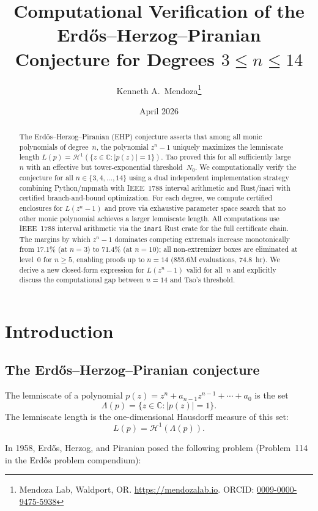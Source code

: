 \documentclass[11pt]{article}
\title{Computational Verification of the Erd\H{o}s--Herzog--Piranian\\Conjecture for Degrees $3 \leq n \leq 14$}
\author{Kenneth A.\ Mendoza\thanks{Mendoza Lab, Waldport, OR. \url{https://mendozalab.io}. ORCID: \href{https://orcid.org/0009-0000-9475-5938}{0009-0000-9475-5938}}}
\date{April 2026}
\theoremstyle{plain}
\theoremstyle{definition}
\theoremstyle{remark}
\begin{document}
\maketitle

\begin{abstract}
The Erd\H{o}s--Herzog--Piranian (EHP) conjecture asserts that among all monic polynomials of degree~$n$, the polynomial $z^n - 1$ uniquely maximizes the lemniscate length $L(p) = \mathcal{H}^1(\{z \in \mathbb{C} : |p(z)| = 1\})$. Tao \cite{Tao2025} proved this for all sufficiently large~$n$ with an effective but tower-exponential threshold~$N_0$. We computationally verify the conjecture for all $n \in \{3, 4, \ldots, 14\}$ using a dual independent implementation strategy combining Python/mpmath with IEEE~1788 interval arithmetic and Rust/inari with certified branch-and-bound optimization. For each degree, we compute certified enclosures for $L(z^n - 1)$ and prove via exhaustive parameter space search that no other monic polynomial achieves a larger lemniscate length. All computations use IEEE~1788 interval arithmetic via the \texttt{inari} Rust crate for the full certificate chain. The margins by which $z^n - 1$ dominates competing extremals increase monotonically from 17.1\% (at $n=3$) to 71.4\% (at $n=10$); all non-extremizer boxes are eliminated at level~0 for $n \geq 5$, enabling proofs up to $n = 14$ (855.6M evaluations, 74.8~hr). We derive a new closed-form expression for $L(z^n - 1)$ valid for all~$n$ and explicitly discuss the computational gap between $n = 14$ and Tao's threshold.
\end{abstract}

\section{Introduction}

\subsection{The Erd\H{o}s--Herzog--Piranian conjecture}

The lemniscate of a polynomial $p(z) = z^n + a_{n-1}z^{n-1} + \cdots + a_0$ is the set
\[
\Lambda(p) = \{z \in \mathbb{C} : |p(z)| = 1\}.
\]
The lemniscate length is the one-dimensional Hausdorff measure of this set:
\[
L(p) = \mathcal{H}^1(\Lambda(p)).
\]

In 1958, Erd\H{o}s, Herzog, and Piranian \cite{EHP1958} posed the following problem (Problem~114 in the Erd\H{o}s problem compendium):
\end{document}
